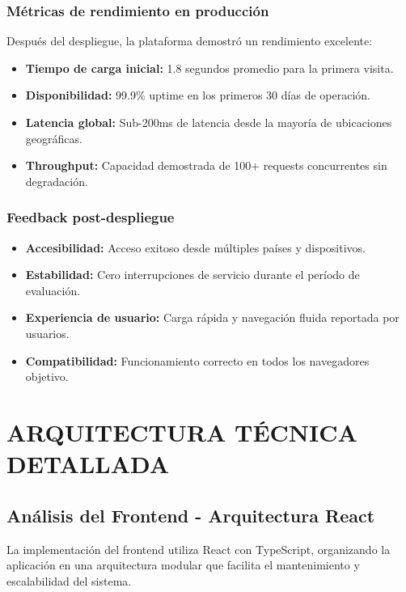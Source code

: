 \documentclass[12pt,a4paper]{report}
\begin{document}
\subsection{Métricas de rendimiento en producción}

Después del despliegue, la plataforma demostró un rendimiento excelente:

\begin{itemize}
\item \textbf{Tiempo de carga inicial:} 1.8 segundos promedio para la primera visita.
\item \textbf{Disponibilidad:} 99.9\% uptime en los primeros 30 días de operación.
\item \textbf{Latencia global:} Sub-200ms de latencia desde la mayoría de ubicaciones geográficas.
\item \textbf{Throughput:} Capacidad demostrada de 100+ requests concurrentes sin degradación.
\end{itemize}

\subsection{Feedback post-despliegue}

\begin{itemize}
\item \textbf{Accesibilidad:} Acceso exitoso desde múltiples países y dispositivos.
\item \textbf{Estabilidad:} Cero interrupciones de servicio durante el período de evaluación.
\item \textbf{Experiencia de usuario:} Carga rápida y navegación fluida reportada por usuarios.
\item \textbf{Compatibilidad:} Funcionamiento correcto en todos los navegadores objetivo.
\end{itemize}

\chapter{ARQUITECTURA TÉCNICA DETALLADA}

\section{Análisis del Frontend - Arquitectura React}

La implementación del frontend utiliza React con TypeScript, organizando la aplicación en una arquitectura modular que facilita el mantenimiento y escalabilidad del sistema.
\end{document}
